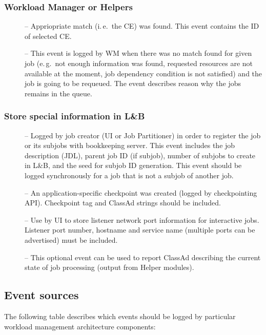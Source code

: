 \documentclass{egee}
\def\LB{L\&B\xspace}
\def\ie{i.\,e.\xspace}
\def\eg{e.\,g.\xspace}
\begin{document}
\subsubsection{Workload Manager or Helpers}

\begin{description}
\item[\jobmatch] -- Appriopriate match (\ie\ the CE) was found.
This event contains the ID of selected CE.
\item[\jobpending] -- This event is logged by WM when there was no match
found for given job (\eg\ not enough information was found, requested
resources are not available at the moment, job dependency condition is not
satisfied) and the job is going to be requeued.
The event describes reason why the jobs remains in the queue.
\end{description}

\subsubsection{Store special information in \LB}
\begin{description}
\item[\jobregister] -- Logged by job creator (UI or Job Partitioner) in order to register the job
or its subjobs with bookkeeping server. This event includes the job description (JDL), parent job ID
(if subjob), number of subjobs to create in \LB, and the seed for subjob ID generation. This event
should be logged synchronously for a job that is not a subjob of another job.

\item[\jobchkpt] -- An application-specific checkpoint was created (logged by checkpointing API).
Checkpoint tag and ClassAd strings should be included.
\item[\joblistener] -- Use by UI to store listener network port information for interactive jobs.
Listener port number, hostname and service name (multiple ports can be advertised) must be included.
\item[\jobcurjdl] -- This optional event can be used to report ClassAd describing the current
state of job processing (output from Helper modules).
\end{description}

\subsection{Event sources}
The following table describes which events should be logged by
particular workload management architecture components:
\\
\end{document}
